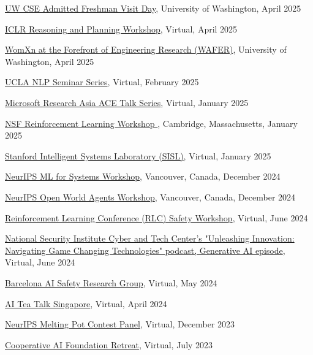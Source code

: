 \documentclass[paper=letter,fontsize=11pt]{scrartcl} %
\newcommand{\TalkEntry}[4]{
		\noindent \href{#4}{#1}, #2, #3 }
\begin{document}
\begin{etaremune}
\item \TalkEntry{UW CSE Admitted Freshman Visit Day}{University of Washington}{April 2025}{https://www.youtube.com/watch?v=KvTGUI4Tznw}
\item \TalkEntry{ICLR Reasoning and Planning Workshop}{Virtual}{April 2025}{https://workshop-llm-reasoning-planning.github.io/}
\item\TalkEntry{WomXn at the Forefront of Engineering Research (WAFER)}{University of Washington}{April 2025}{https://www.ece.uw.edu/news-events/wafer/}
\item\TalkEntry{UCLA NLP Seminar Series}{Virtual}{February 2025}{}
\item\TalkEntry{Microsoft Research Asia ACE Talk Series}{Virtual}{January 2025}{}
\item\TalkEntry{NSF Reinforcement Learning Workshop%
}{Cambridge, Massachusetts}{January 2025}{https://sites.harvard.edu/nsf-rl-workshop/schedule/}
\item\TalkEntry{Stanford Intelligent Systems Laboratory (SISL)}{Virtual}{January 2025}{}
\item\TalkEntry{NeurIPS ML for Systems Workshop}{Vancouver, Canada}{December 2024}{https://neurips.cc/virtual/2024/workshop/84699}
\item\TalkEntry{NeurIPS Open World Agents Workshop}{Vancouver, Canada}{December 2024}{https://sites.google.com/view/open-world-agents/schedule?authuser=0}
\item\TalkEntry{Reinforcement Learning Conference (RLC) Safety Workshop}{Virtual}{June 2024}{https://rlsafetyworkshop.github.io/}
\item\TalkEntry{National Security Institute Cyber and Tech Center's "Unleashing Innovation: Navigating Game Changing Technologies" podcast, Generative AI episode}{Virtual}{June 2024}{https://www.youtube.com/watch?v=Kv9BjGKWx2E&list=PL46I6ct71LWPe_CvHvED3Qnv9Jh-2g2Zb&index=2}
\item\TalkEntry{Barcelona AI Safety Research Group}{Virtual}{May 2024}{https://www.youtube.com/watch?v=8noPGzogpk4}
\item\TalkEntry{AI Tea Talk Singapore}{Virtual}{April 2024}{https://www.youtube.com/watch?v=VOgrYxFe-r0 }
\item\TalkEntry{NeurIPS Melting Pot Contest Panel}{Virtual}{December 2023}{https://nips.cc/virtual/2023/83652}
\item\TalkEntry{Cooperative AI Foundation Retreat}{Virtual}{July 2023}{https://www.youtube.com/watch?v=56PlUikhB3o&list=PL4gbzAVOpp7AN4mYx7-KQN-T1Zv82uNu-&index=3&t=403s}

\end{etaremune}
\end{document}
